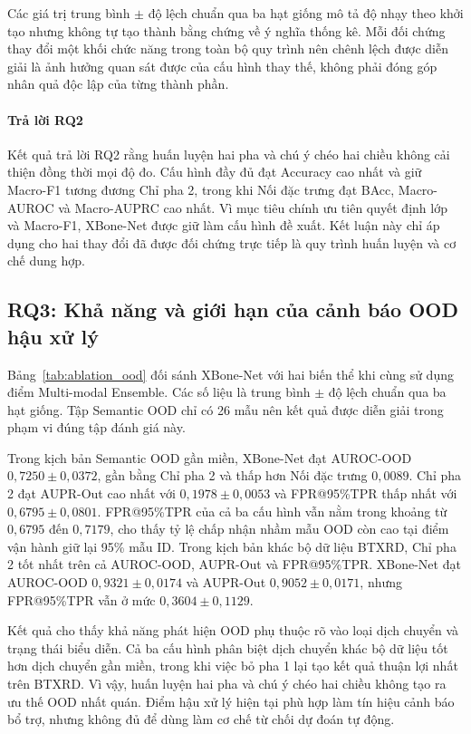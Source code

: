 Các giá trị trung bình $\pm$ độ lệch chuẩn qua ba hạt giống mô tả độ nhạy theo khởi tạo nhưng không tự tạo thành bằng chứng về ý nghĩa thống kê. Mỗi đối chứng thay đổi một khối chức năng trong toàn bộ quy trình nên chênh lệch được diễn giải là ảnh hưởng quan sát được của cấu hình thay thế, không phải đóng góp nhân quả độc lập của từng thành phần.

\paragraph{Trả lời RQ2}
Kết quả trả lời RQ2 rằng huấn luyện hai pha và chú ý chéo hai chiều không cải thiện đồng thời mọi độ đo. Cấu hình đầy đủ đạt Accuracy cao nhất và giữ Macro-F1 tương đương Chỉ pha 2, trong khi Nối đặc trưng đạt BAcc, Macro-AUROC và Macro-AUPRC cao nhất. Vì mục tiêu chính ưu tiên quyết định lớp và Macro-F1, XBone-Net được giữ làm cấu hình đề xuất. Kết luận này chỉ áp dụng cho hai thay đổi đã được đối chứng trực tiếp là quy trình huấn luyện và cơ chế dung hợp.

\subsection{RQ3: Khả năng và giới hạn của cảnh báo OOD hậu xử lý}
\label{subsec:ablation_ood_results}

Bảng~\ref{tab:ablation_ood} đối sánh XBone-Net với hai biến thể khi cùng sử dụng điểm Multi-modal Ensemble. Các số liệu là trung bình $\pm$ độ lệch chuẩn qua ba hạt giống. Tập Semantic OOD chỉ có 26 mẫu nên kết quả được diễn giải trong phạm vi đúng tập đánh giá này.



Trong kịch bản Semantic OOD gần miền, XBone-Net đạt AUROC-OOD $0{,}7250\pm0{,}0372$, gần bằng Chỉ pha 2 và thấp hơn Nối đặc trưng $0{,}0089$. Chỉ pha 2 đạt AUPR-Out cao nhất với $0{,}1978\pm0{,}0053$ và FPR@95\%TPR thấp nhất với $0{,}6795\pm0{,}0801$. FPR@95\%TPR của cả ba cấu hình vẫn nằm trong khoảng từ $0{,}6795$ đến $0{,}7179$, cho thấy tỷ lệ chấp nhận nhầm mẫu OOD còn cao tại điểm vận hành giữ lại 95\% mẫu ID. Trong kịch bản khác bộ dữ liệu BTXRD, Chỉ pha 2 tốt nhất trên cả AUROC-OOD, AUPR-Out và FPR@95\%TPR. XBone-Net đạt AUROC-OOD $0{,}9321\pm0{,}0174$ và AUPR-Out $0{,}9052\pm0{,}0171$, nhưng FPR@95\%TPR vẫn ở mức $0{,}3604\pm0{,}1129$.

Kết quả cho thấy khả năng phát hiện OOD phụ thuộc rõ vào loại dịch chuyển và trạng thái biểu diễn. Cả ba cấu hình phân biệt dịch chuyển khác bộ dữ liệu tốt hơn dịch chuyển gần miền, trong khi việc bỏ pha 1 lại tạo kết quả thuận lợi nhất trên BTXRD. Vì vậy, huấn luyện hai pha và chú ý chéo hai chiều không tạo ra ưu thế OOD nhất quán. Điểm hậu xử lý hiện tại phù hợp làm tín hiệu cảnh báo bổ trợ, nhưng không đủ để dùng làm cơ chế từ chối dự đoán tự động.

